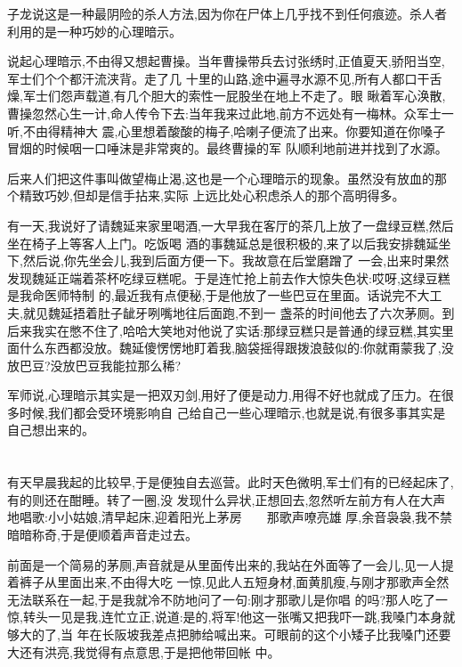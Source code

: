 ﻿\documentclass[12pt,twocolumn]{article}
\begin{document}
子龙说这是一种最阴险的杀人方法,因为你在尸体上几乎找不到任何痕迹。杀人者利用的是一种巧妙的心理暗示。

说起心理暗示,不由得又想起曹操。当年曹操带兵去讨张绣时,正值夏天,骄阳当空,军士们个个都汗流浃背。走了几
十里的山路,途中遍寻水源不见,所有人都口干舌燥,军士们怨声载道,有几个胆大的索性一屁股坐在地上不走了。眼
瞅着军心涣散,曹操忽然心生一计,命人传令下去:当年我来过此地,前方不远处有一梅林。众军士一听,不由得精神大
震,心里想着酸酸的梅子,哈喇子便流了出来。你要知道在你嗓子冒烟的时候咽一口唾沫是非常爽的。最终曹操的军
队顺利地前进并找到了水源。

后来人们把这件事叫做望梅止渴,这也是一个心理暗示的现象。虽然没有放血的那个精致巧妙,但却是信手拈来,实际
上远比处心积虑杀人的那个高明得多。

有一天,我说好了请魏延来家里喝酒,一大早我在客厅的茶几上放了一盘绿豆糕,然后坐在椅子上等客人上门。吃饭喝
酒的事魏延总是很积极的,来了以后我安排魏延坐下,然后说,你先坐会儿,我到后面方便一下。我故意在后堂磨蹭了
一会,出来时果然发现魏延正端着茶杯吃绿豆糕呢。于是连忙抢上前去作大惊失色状:哎呀,这绿豆糕是我命医师特制
的,最近我有点便秘,于是他放了一些巴豆在里面。话说完不大工夫,就见魏延捂着肚子龇牙咧嘴地往后面跑,不到一
盏茶的时间他去了六次茅厕。到后来我实在憋不住了,哈哈大笑地对他说了实话:那绿豆糕只是普通的绿豆糕,其实里
面什么东西都没放。魏延傻愣愣地盯着我,脑袋摇得跟拨浪鼓似的:你就甭蒙我了,没放巴豆?没放巴豆我能拉那么稀?

军师说,心理暗示其实是一把双刃剑,用好了便是动力,用得不好也就成了压力。在很多时候,我们都会受环境影响自
己给自己一些心理暗示,也就是说,有很多事其实是自己想出来的。

\section{}

有天早晨我起的比较早,于是便独自去巡营。此时天色微明,军士们有的已经起床了,有的则还在酣睡。转了一圈,没
发现什么异状,正想回去,忽然听左前方有人在大声地唱歌:小小姑娘,清早起床,迎着阳光上茅房~~~~那歌声嘹亮雄
厚,余音袅袅,我不禁暗暗称奇,于是便顺着声音走过去。

前面是一个简易的茅厕,声音就是从里面传出来的,我站在外面等了一会儿,见一人提着裤子从里面出来,不由得大吃
一惊,见此人五短身材,面黄肌瘦,与刚才那歌声全然无法联系在一起,于是我就冷不防地问了一句:刚才那歌儿是你唱
的吗?那人吃了一惊,转头一见是我,连忙立正,说道:是的,将军!他这一张嘴又把我吓一跳,我嗓门本身就够大的了,当
年在长阪坡我差点把肺给喊出来。可眼前的这个小矮子比我嗓门还要大还有洪亮,我觉得有点意思,于是把他带回帐
中。
\end{document}
